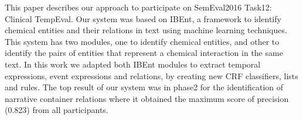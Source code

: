 This paper describes our approach to participate on SemEval2016 Task12: Clinical TempEval. Our system was based on IBEnt, a framework to identify chemical entities and their relations in text using machine learning techniques. This system has two modules, one to identify chemical entities, and other to identify the pairs of entities that represent a chemical interaction in the same text. In this work we adapted both IBEnt modules to extract temporal expressions, event expressions and relations, by creating new CRF classifiers, lists and rules. The top result of our system was in phase2 for the identification of narrative container relations where it obtained the maximum score of precision (0.823) from all participants.
